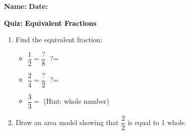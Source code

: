 \documentclass[12pt, letterpaper, fleqn]{article}
\newcommand{\blank}{\underline{\hspace{2.2cm}}}
\begin{document}
\textbf{Name:} \underline{\hspace{5cm}}
\hfill
\textbf{Date:} \underline{\hspace{3cm}}\\

\begin{tcolorbox}[colback=customteal!20]
    \large\textcolor{black}{\textbf{Quiz: Equivalent Fractions}}
\end{tcolorbox}

\vspace{5mm}
\begin{enumerate}[itemsep=2.5cm, leftmargin=0.6cm]
\item Find the equivalent fraction:
\begin{itemize}[itemsep=1cm]
  \item $\dfrac{1}{2} = \dfrac{\text{?}}{8}$ \quad $\text{?} =$ \blank
  \item $\dfrac{2}{4} = \dfrac{\text{?}}{2}$ \quad $\text{?} =$ \blank
  \item $\dfrac{3}{3} = $ \blank \quad (Hint: whole number)
\end{itemize}

\item Draw an area model showing that $\dfrac{2}{2}$ is equal to 1 whole.
\end{enumerate}
\end{document}
